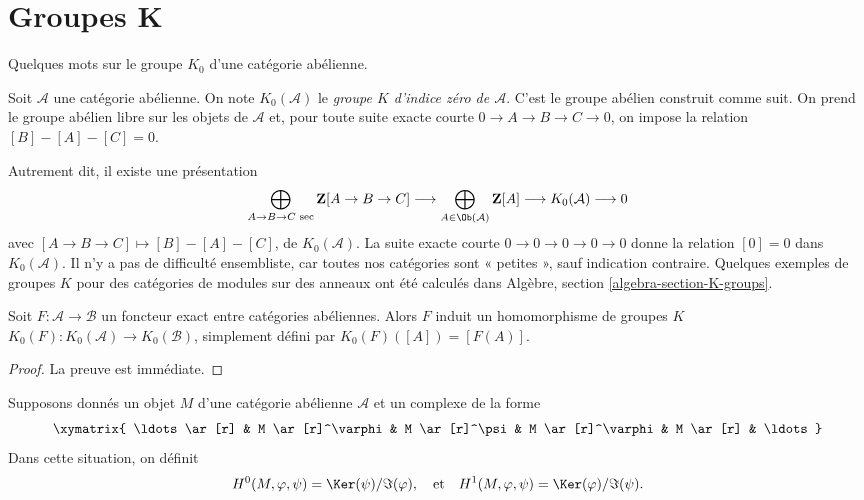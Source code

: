 \section{Groupes K}
\label{section-K-groups}

\noindent
Quelques mots sur le groupe $K_0$ d'une catégorie abélienne.

\begin{definition}
\label{definition-K-zero}
Soit $\mathcal{A}$ une catégorie abélienne.
On note $K_0(\mathcal{A})$ le
{\it groupe $K$ d'indice zéro de $\mathcal{A}$}.
C'est le groupe abélien construit comme suit.
On prend le groupe abélien libre
sur les objets de $\mathcal{A}$
et, pour toute suite exacte courte
$0 \to A \to B \to C \to 0$,
on impose la relation $[B] - [A] - [C] = 0$.
\end{definition}

\noindent
Autrement dit, il existe une présentation
$$
\bigoplus_{A \to B \to C\text{ sec}}
\mathbf{Z}[A \to B \to C]
\longrightarrow
\bigoplus_{A \in \Ob(\mathcal{A})}
\mathbf{Z}[A]
\longrightarrow
K_0(\mathcal{A})
\longrightarrow
0
$$
avec $[A \to B \to C] \mapsto [B] - [A] - [C]$, de $K_0(\mathcal{A})$.
La suite exacte courte $0 \to 0 \to 0 \to 0 \to 0$
donne la relation $[0] = 0$ dans $K_0(\mathcal{A})$.
Il n'y a pas de difficulté ensembliste, car toutes nos catégories
sont « petites », sauf indication contraire.
Quelques exemples de groupes $K$ pour des catégories de modules
sur des anneaux ont été calculés dans
Algèbre, section \ref{algebra-section-K-groups}.

\begin{lemma}
\label{lemma-exact-functor-K-groups}
Soit $F : \mathcal{A} \to \mathcal{B}$ un foncteur exact entre
catégories abéliennes. Alors $F$ induit un homomorphisme de groupes $K$
$K_0(F) : K_0(\mathcal{A}) \to K_0(\mathcal{B})$, simplement défini par
$K_0(F)([A]) = [F(A)]$.
\end{lemma}

\begin{proof}
La preuve est immédiate.
\end{proof}

\noindent
Supposons donnés un objet $M$ d'une catégorie abélienne $\mathcal{A}$
et un complexe de la forme
\begin{equation}
\label{equation-cyclic-complex}
\xymatrix{
\ldots \ar[r] &
M \ar[r]^\varphi &
M \ar[r]^\psi &
M \ar[r]^\varphi &
M \ar[r] & \ldots
}
\end{equation}
Dans cette situation, on définit
$$
H^0(M, \varphi, \psi) = \Ker(\psi)/\Im(\varphi)
, \quad\text{et}\quad
H^1(M, \varphi, \psi) = \Ker(\varphi)/\Im(\psi).
$$

